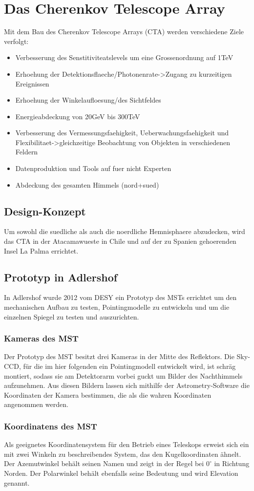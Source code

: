 \chapter{Das Cherenkov Telescope Array}
Mit dem Bau des Cherenkov Telescope Arrays (CTA) werden verschiedene Ziele verfolgt:
\begin{itemize}

\item Verbesserung des Senstitiviteatslevels um eine Grossenordnung auf 1TeV
\item Erhoehung der Detektionsflaeche/Photonenrate->Zugang zu kurzeitigen Ereignissen
\item Erhoehung der Winkelaufloesung/des Sichtfeldes
\item Energieabdeckung von 20GeV bis 300TeV
\item Verbesserung des Vermessungsfaehigkeit, Ueberwachungsfaehigkeit und Flexibilitaet->gleichzeitige Beobachtung von Objekten in verschiedenen Feldern
\item Datenproduktion und Tools auf fuer nicht Experten
\item Abdeckung des gesamten Himmels (nord+sued)
\end{itemize}

\section{Design-Konzept}
Um sowohl die suedliche als auch die noerdliche Hemnisphaere abzudecken, wird das CTA in der Atacamawueste in Chile und auf der zu Spanien gehoerenden Insel La Palma errichtet.


\section{Prototyp in Adlershof}
In Adlershof wurde 2012 vom DESY ein Prototyp des MSTs errichtet um den mechanischen Aufbau zu testen, Pointingmodelle zu entwickeln und um die einzelnen Spiegel zu testen und auszurichten.

\subsection{Kameras des MST}
Der Prototyp des MST besitzt drei Kameras in der Mitte des Reflektors. Die Sky-CCD, für die im hier folgenden ein Pointingmodell entwickelt wird, ist schräg montiert, sodass sie am Detektorarm vorbei guckt um Bilder des Nachthimmels aufzunehmen. Aus diesen Bildern lassen sich mithilfe der Astrometry-Software die Koordinaten der Kamera bestimmen, die als die wahren Koordinaten angenommen werden.

\subsection{Koordinatens des MST}
Als geeignetes Koordinatensystem für den Betrieb eines Teleskops erweist sich ein mit zwei Winkeln zu beschreibendes System, das den Kugelkoordinaten ähnelt. Der Azemutwinkel behält seinen Namen und zeigt in der Regel bei $0^\circ$ in Richtung Norden. Der Polarwinkel behält ebenfalls seine Bedeutung und wird Elevation genannt.
